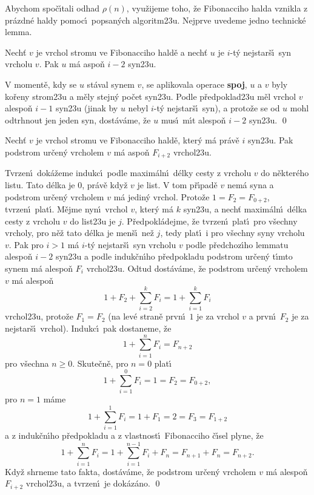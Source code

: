 \documentclass[a4paper,12pt]{article}
\begin{document}
\flushpar Abychom spo\v c\'\i tali odhad $\rho (n)$, vyu\v zijeme toho, \v ze 
Fibonacciho halda vznikla z pr\'azdn\'e haldy pomoc\'\i\ 
popsan\'ych algoritm\accent23u. Nejprve uvedeme jedno technick\'e 
lemma.
\medskip

Nech\v t $v$ je vrchol stromu ve 
Fibonacciho hald\v e a nech\v t $u$ je $i$-t\'y nejstar\v s\'\i\ syn 
vrcholu $v$. Pak $u$ m\'a aspo\v n $i-2$ syn\accent23u.
\endproclaim

V moment\v e, kdy se $u$ st\'aval synem $v$, se 
aplikovala operace {\bf spoj}, $u$ a $v$ byly ko\v reny 
strom\accent23u a m\v ely stejn\'y po\v cet syn\accent23u. 
Podle p\v redpoklad\accent23u m\v el vrchol $v$ alespo\v n $i-1$ 
syn\accent23u (jinak by $u$ nebyl $i$-t\'y nejstar\v s\'\i\ syn), a 
proto\v ze se od $u$ mohl odtrhnout jen jeden syn, 
dost\'av\'ame, \v ze $u$ mus\'\i\ m\'\i t alespo\v n $i-2$ syn\accent23u. \qed
\enddemo
\medskip

Nech\v t $v$ je vrchol stromu ve 
Fibonacciho hald\v e, kte\-r\'y m\'a pr\'av\v e $i$ syn\accent23u. Pak 
podstrom ur\v cen\'y vrcholem $v$ m\'a aspo\v n $F_{i+2}$ 
vrchol\accent23u.
\endproclaim

Tvrzen\'\i\ dok\'a\v zeme indukc\'\i\ 
podle maxim\'aln\'\i\ d\'elky cesty z vrcholu $v$ do n\v ekter\'eho 
listu.  Tato d\'elka je $0$, pr\'av\v e kdy\v z $v$ je list.  V tom 
p\v r\'\i pad\v e $v$ nem\'a syna a podstrom ur\v cen\'y vrcholem $
v$ m\'a 
jedin\'y vrchol.  Proto\v ze $1=F_2=F_{0+2}$, tvrzen\'\i\ plat\'\i .  
M\v ejme nyn\'\i\ vrchol $v$, kter\'y m\'a $k$ 
syn\accent23u, a nech\v t maxim\'aln\'\i\ d\'elka cesty z vrcholu $
v$ do 
list\accent23u je $j$. P\v redpokl\'adej\-me, \v ze tvrzen\'\i\ plat\'\i\ pro 
v\v sechny vrcholy, pro n\v e\v z tato d\'elka  
je men\v s\'\i\ ne\v z $j$,  tedy plat\'\i\ i pro 
v\v sechny syny vrcholu $v$.  Pak pro $i>1$ m\'a $i$-t\'y nejstar\v s\'\i\ 
syn vrcholu $v$ podle p\v redchoz\'\i ho lemmatu alespo\v n $i-2$ 
syn\accent23u a podle induk\v cn\'\i ho p\v redpokladu podstrom ur\v cen\'y 
t\'\i mto synem m\'a alespo\v n $F_i$ vrchol\accent23u.  Odtud 
dost\'av\'ame, \v ze podstrom ur\v cen\'y vrcholem $v$ m\'a alespo\v n 
$$1+F_2+\sum_{i=2}^kF_i=1+\sum_{i=1}^kF_i$$
vrchol\accent23u, proto\v ze $F_1=F_2$ (na lev\'e stran\v e prvn\'\i\ $
1$ 
je za vrchol $v$ a 
prvn\'\i\ $F_2$ je za nejstar\v s\'\i\ vrchol). Indukc\'\i\ pak dostaneme, \v ze 
$$1+\sum_{i=1}^nF_i=F_{n+2}$$
pro v\v sechna $n\ge 0$. Skute\v cn\v e, pro $n=0$ plat\'\i\ 
$$1+\sum_{i=1}^0F_i=1=F_2=F_{0+2},$$
pro $n=1$ m\'ame 
$$1+\sum_{i=1}^1F_i=1+F_1=2=F_3=F_{1+2}$$
a z induk\v cn\'\i ho p\v redpokladu a z vlastnost\'\i\ Fibonacciho 
\v c\'\i sel plyne, \v ze 
$$1+\sum_{i=1}^nF_i=1+\sum_{i=1}^{n-1}F_i+F_n=F_{n+1}+F_n=F_{n+2}
.$$
Kdy\v z shrneme tato fakta, dost\'av\'ame, \v ze podstrom 
ur\v cen\'y vrcholem $v$ m\'a alespo\v n $F_{i+2}$ vrchol\accent23u, a 
tvrzen\'\i\ je dok\'az\'ano. \qed
\enddemo
\medskip
\end{document}
